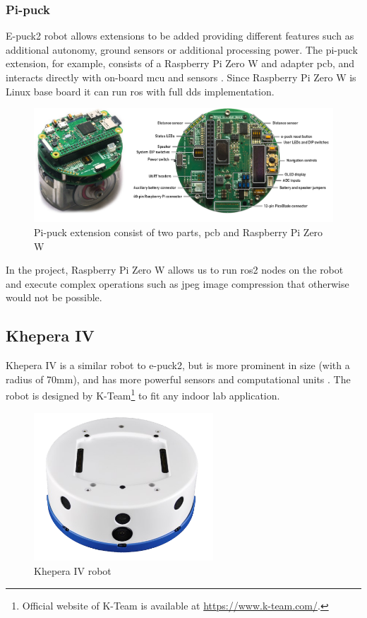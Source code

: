 \subsubsection{Pi-puck}

E-puck2 robot allows extensions to be added providing different features such as additional autonomy, ground sensors or additional processing power.
The pi-puck extension, for example, consists of a Raspberry Pi Zero W and adapter \ac{pcb}, and interacts directly with on-board \ac{mcu} and sensors \cite{millard_pi-puck_2017}.
Since Raspberry Pi Zero W is Linux base board it can run \ac{ros} with full \ac{dds} implementation.

\begin{figure}[H]
    \centering
    \includegraphics[width=\textwidth]{background/figures/pi-puck.png}
    \caption{Pi-puck extension consist of two parts, \ac{pcb} and Raspberry Pi Zero W \cite{millard_pi-puck_2017}}
    \label{fig:background:pi-puck}
\end{figure}

In the project, Raspberry Pi Zero W allows us to run \ac{ros2} nodes on the robot and execute complex operations such as \acs{jpeg} image compression that otherwise would not be possible.

\subsection{Khepera IV}

Khepera IV is a similar robot to e-puck2, but is more prominent in size (with a radius of 70mm), and has more powerful sensors and computational units \cite{reis_khepera_2016}.
The robot is designed by K-Team\footnote{Official website of K-Team is available at \url{https://www.k-team.com/}.} to fit any indoor lab application.

\begin{figure}[H]
    \centering
    \includegraphics[width=0.6\textwidth]{background/figures/khepera_iv.png}
    \caption{Khepera IV robot \cite{reis_khepera_2016}}
    \label{fig:background:khepera_iv}
\end{figure}

